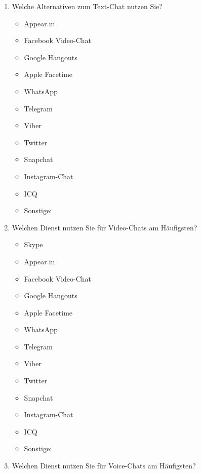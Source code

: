 \begin{enumerate}[resume]
\item Welche Alternativen zum Text-Chat nutzen Sie?

		\begin{itemize}
		\item[\Circle] Appear.in
        \item[\Circle] Facebook Video-Chat
        \item[\Circle] Google Hangouts
        \item[\Circle] Apple Facetime
        \item[\Circle] WhatsApp
        \item[\Circle] Telegram
        \item[\Circle] Viber
        \item[\Circle] Twitter
        \item[\Circle] Snapchat
        \item[\Circle] Instagram-Chat
        \item[\Circle] ICQ
        \item[\Circle] Sonstige:~\underline{\hspace{7.5cm}}
        \end{itemize}

\item Welchen Dienst nutzen Sie für Video-Chats am Häufigsten?

		\begin{itemize}
        \item[\Circle] Skype
		\item[\Circle] Appear.in
        \item[\Circle] Facebook Video-Chat
        \item[\Circle] Google Hangouts
        \item[\Circle] Apple Facetime
        \item[\Circle] WhatsApp
        \item[\Circle] Telegram
        \item[\Circle] Viber
        \item[\Circle] Twitter
        \item[\Circle] Snapchat
        \item[\Circle] Instagram-Chat
        \item[\Circle] ICQ
        \item[\Circle] Sonstige:~\underline{\hspace{7.5cm}}
        \end{itemize}

\item Welchen Dienst nutzen Sie für Voice-Chats am Häufigsten?


\end{enumerate}
